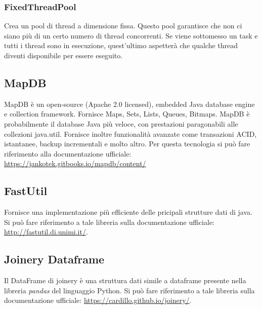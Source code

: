 \subsubsection{FixedThreadPool}
Crea un pool di thread a dimensione fissa. Questo pool garantisce che non ci siano più di un certo numero di thread concorrenti. Se viene sottomesso un task e tutti i thread sono in esecuzione, quest'ultimo aspetterà che qualche thread diventi disponibile per essere eseguito.

\subsection{MapDB}
MapDB è un open-source (Apache 2.0 licensed), embedded Java database engine e collection framework. Fornisce Maps, Sets, Lists, Queues, Bitmaps.
MapDB è probabilmente il database Java più veloce, con prestazioni paragonabili alle collezioni java.util. Fornisce inoltre funzionalità avanzate come transazioni ACID, istantanee, backup incrementali e molto altro.
Per questa tecnologia si può fare riferimento alla documentazione ufficiale: \url{https://jankotek.gitbooks.io/mapdb/content/}
\subsection{FastUtil}
Fornisce una implementazione più efficiente delle pricipali strutture dati di java. Si può fare riferimento a tale libreria sulla documentazione ufficiale: \url{http://fastutil.di.unimi.it/}.
\subsection{Joinery Dataframe}
Il DataFrame di joinery è una struttura dati simile a dataframe presente nella libreria \emph{pandas} del linguaggio Python. Si può fare riferimento a tale libreria sulla documentazione ufficiale: \url{https://cardillo.github.io/joinery/}.

